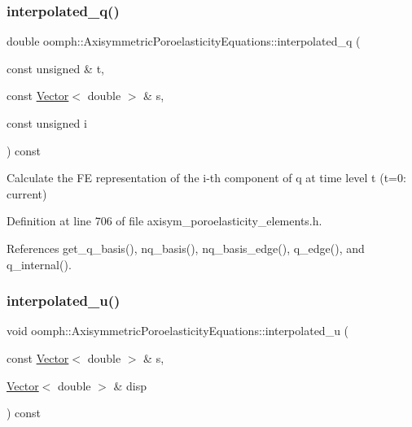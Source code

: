 \subsubsection{\texorpdfstring{interpolated\+\_\+q()}{interpolated\_q()}\hspace{0.1cm}{\footnotesize\ttfamily [4/4]}}
{\footnotesize\ttfamily double oomph\+::\+Axisymmetric\+Poroelasticity\+Equations\+::interpolated\+\_\+q (\begin{DoxyParamCaption}\item[{const unsigned \&}]{t,  }\item[{const \hyperlink{classoomph_1_1Vector}{Vector}$<$ double $>$ \&}]{s,  }\item[{const unsigned}]{i }\end{DoxyParamCaption}) const\hspace{0.3cm}{\ttfamily [inline]}}

Calculate the FE representation of the i-\/th component of q at time level t (t=0\+: current) 

Definition at line 706 of file axisym\+\_\+poroelasticity\+\_\+elements.\+h.



References get\+\_\+q\+\_\+basis(), nq\+\_\+basis(), nq\+\_\+basis\+\_\+edge(), q\+\_\+edge(), and q\+\_\+internal().

\mbox{\label{classoomph_1_1AxisymmetricPoroelasticityEquations_a2ddb74516ff73b843bbc3994098bea30}} 
\subsubsection{\texorpdfstring{interpolated\+\_\+u()}{interpolated\_u()}\hspace{0.1cm}{\footnotesize\ttfamily [1/3]}}
{\footnotesize\ttfamily void oomph\+::\+Axisymmetric\+Poroelasticity\+Equations\+::interpolated\+\_\+u (\begin{DoxyParamCaption}\item[{const \hyperlink{classoomph_1_1Vector}{Vector}$<$ double $>$ \&}]{s,  }\item[{\hyperlink{classoomph_1_1Vector}{Vector}$<$ double $>$ \&}]{disp }\end{DoxyParamCaption}) const\hspace{0.3cm}{\ttfamily [inline]}}



